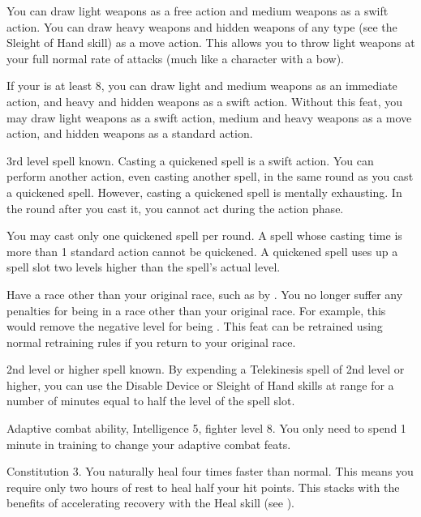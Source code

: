 \featben You can draw light weapons as a free action and medium weapons as a swift action.
You can draw heavy weapons and hidden weapons of any type (see the Sleight of Hand skill) as a move action.
This allows you to throw light weapons at your full normal rate of attacks (much like a character with a bow).

If your  is at least 8, you can draw light and medium weapons as an immediate action, and heavy and hidden weapons as a swift action.
Without this feat, you may draw light weapons as a swift action, medium and heavy weapons as a move action, and hidden weapons as a standard action.

\label{Quicken Spell}
\featpre 3rd level spell known.
\featben Casting a quickened spell is a swift action.
You can perform another action, even casting another spell, in the same round as you cast a quickened spell.
However, casting a quickened spell is mentally exhausting.
In the round after you cast it, you cannot act during the action phase.

You may cast only one quickened spell per round.
A spell whose casting time is more than 1 standard action cannot be quickened.
A quickened spell uses up a spell slot two levels higher than the spell's actual level.

\label{Racial Acclimation}
\featpre Have a race other than your original race, such as by .
\featben You no longer suffer any penalties for being in a race other than your original race.
For example, this would remove the negative level for being .
This feat can be retrained using normal retraining rules if you return to your original race.

\featpre 2nd level or higher  spell known.
\featben By expending a Telekinesis spell of 2nd level or higher, you can use the Disable Device or Sleight of Hand skills at \rngclose range for a number of minutes equal to half the level of the spell slot.

\featpre Adaptive combat ability, Intelligence 5, fighter level 8.
\featben You only need to spend 1 minute in training to change your adaptive combat feats.

\featpre Constitution 3.
\featben You naturally heal four times faster than normal.
This means you require only two hours of rest to heal half your hit points.
This stacks with the benefits of accelerating recovery with the Heal skill (see ).

